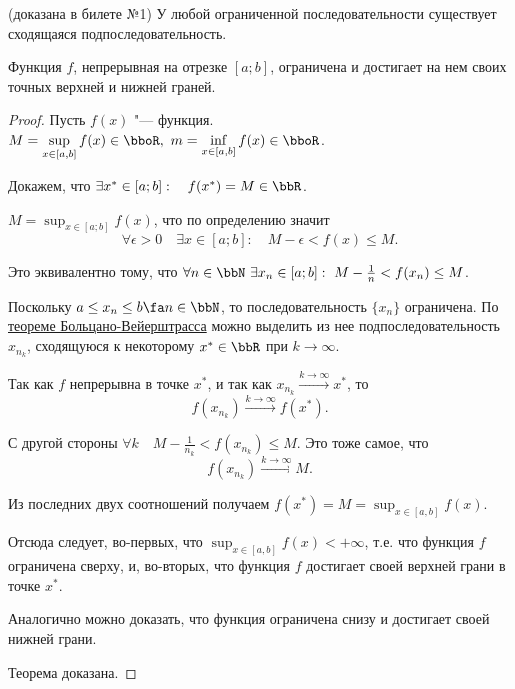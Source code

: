 \begin{thm}\textup{(}доказана в билете №1\textup{)}
У любой ограниченной последовательности существует сходящаяся подпоследовательность.
\end{thm}


\begin{thm}  \label{ch1n1}
Функция $f$, непрерывная на отрезке $[a;b]$, ограничена и достигает на нем своих точных верхней и нижней граней.
\end{thm}
\begin{proof}\leavevmode

Пусть $f(x)$ "--- функция. $M = \sup_{x \in [a,b]}\limits f(x) \in \bboR,\  m = \inf_{x \in [a,b]}\limits f(x) \in \bboR$.

Докажем, что $\exists x^* \in [a;b]:\quad f(x^*)= M \in \bbR$.
\smallskip

$M = \sup_{x \in [a;b]}\limits f(x)$, что по определению значит 
$$
\forall\epsilon > 0\quad \exists x\in [a;b]:\quad M-\epsilon < f(x) \le M. 
$$ 

Это эквивалентно тому, что $\forall n \in \bbN\ \exists x_n \in [a;b]:\ M-\frac{1}{n} < f(x_n) \le M $.

Поскольку $ a\le x_n \le b \fa n \in \bbN$, то последовательность $\{x_n\}$ ограничена. По \hyperref[exp9]{теореме Больцано-Вейерштрасса} можно выделить из нее подпоследовательность ${x_{n_k}}$, сходящуюся к некоторому $x^* \in \bbR$ при $k \to \infty$.

Так как $f$ непрерывна в точке $x^*$, и так как $x_{n_k}\xrightarrow{k \to \infty} x^*$, то  
$$
f(x_{n_k}) \xrightarrow{k \to \infty} f(x^*).
$$ 

С другой стороны $\forall k \quad M-\frac{1}{n_k} < f(x_{n_k}) \le M$. Это тоже самое, что
$$
f(x_{n_k}) \xrightarrow{k \to \infty} M.
$$

Из последних двух соотношений получаем $f(x^*) = M = \sup_{x \in [a,b]}\limits f(x) $. 

Отсюда следует, во-первых, что  $\sup_{x \in [a,b]}\limits f(x)<+\infty$, т.е. что функция $f$ ограничена сверху, и, во-вторых, что функция $f$ достигает своей верхней грани в точке $x^*$.

Аналогично можно доказать, что функция ограничена снизу и достигает своей нижней грани.

Теорема доказана.   
\end{proof}